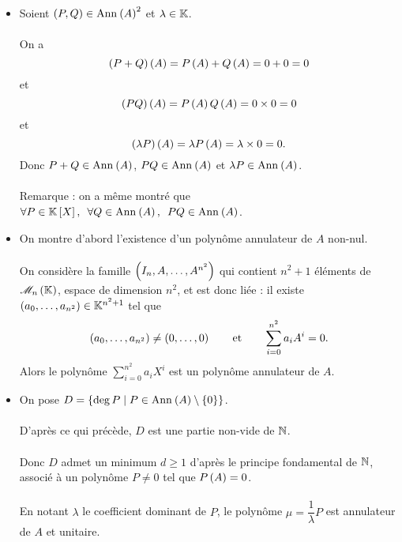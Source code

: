 \begin{dem}
\begin{itemize}
    \item Soient \(\paren{P,Q}\in\Ann{A}^2\) et \(\lambda\in\mathbb{K}\). \\\\ On a \[\left(P+Q\right)\left(A\right)=P\left(A\right)+Q\left(A\right)=0+0=0\] et \[\left(PQ\right)\left(A\right)=P\left(A\right)Q\left(A\right)=0\times0=0\] et \[\left(\lambda P\right)\left(A\right)=\lambda P\left(A\right)=\lambda\times0=0.\] Donc \(P+Q\in\Ann{A}\), \(PQ\in\Ann{A}\) et \(\lambda P\in\Ann{A}\). \\\\ Remarque : on a même montré que \(\quantifs{\forall P\in\poly;\forall Q\in\Ann{A}}PQ\in\Ann{A}\). \\
    \item On montre d'abord l'existence d'un polynôme annulateur de \(A\) non-nul. \\\\ On considère la famille \(\left(I_n,A,\dots,A^{n^2}\right)\) qui contient \(n^2+1\) éléments de \(\M{n}\), espace de dimension \(n^2\), et est donc liée : il existe \(\left(a_0,\dots,a_{n^2}\right)\in\mathbb{K}^{n^2+1}\) tel que \[\left(a_0,\dots,a_{n^2}\right)\not=\left(0,\dots,0\right)\qquad\text{et}\qquad\sum_{i=0}^{n^2}a_iA^i=0.\] Alors le polynôme \(\sum_{i=0}^{n^2}a_iX^i\) est un polynôme annulateur de \(A\). \\
    \item On pose \(D=\accol{\deg P\tq P\in\Ann{A}\excluant\accol{0}}\). \\\\ D'après ce qui précède, \(D\) est une partie non-vide de \(\mathbb{N}\). \\\\ Donc \(D\) admet un minimum \(d\geq1\) d'après le principe fondamental de \(\mathbb{N}\), associé à un polynôme \(P\not=0\) tel que \(P\left(A\right)=0\). \\\\ En notant \(\lambda\) le coefficient dominant de \(P\), le polynôme \(\mu=\dfrac{1}{\lambda}P\) est annulateur de \(A\) et unitaire. \\

\end{itemize}
\end{dem}
